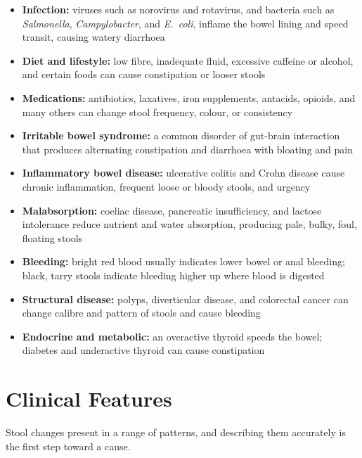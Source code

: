 \begin{itemize}
    \item \textbf{Infection:} viruses such as norovirus and rotavirus, and bacteria such as \textit{Salmonella}, \textit{Campylobacter}, and \textit{E.~coli}, inflame the bowel lining and speed transit, causing watery diarrhoea
    \item \textbf{Diet and lifestyle:} low fibre, inadequate fluid, excessive caffeine or alcohol, and certain foods can cause constipation or looser stools
    \item \textbf{Medications:} antibiotics, laxatives, iron supplements, antacids, opioids, and many others can change stool frequency, colour, or consistency
    \item \textbf{Irritable bowel syndrome:} a common disorder of gut-brain interaction that produces alternating constipation and diarrhoea with bloating and pain
    \item \textbf{Inflammatory bowel disease:} ulcerative colitis and Crohn disease cause chronic inflammation, frequent loose or bloody stools, and urgency
    \item \textbf{Malabsorption:} coeliac disease, pancreatic insufficiency, and lactose intolerance reduce nutrient and water absorption, producing pale, bulky, foul, floating stools
    \item \textbf{Bleeding:} bright red blood usually indicates lower bowel or anal bleeding; black, tarry stools indicate bleeding higher up where blood is digested
    \item \textbf{Structural disease:} polyps, diverticular disease, and colorectal cancer can change calibre and pattern of stools and cause bleeding
    \item \textbf{Endocrine and metabolic:} an overactive thyroid speeds the bowel; diabetes and underactive thyroid can cause constipation
\end{itemize}

\section*{Clinical Features}
Stool changes present in a range of patterns, and describing them accurately is the first step toward a cause.

